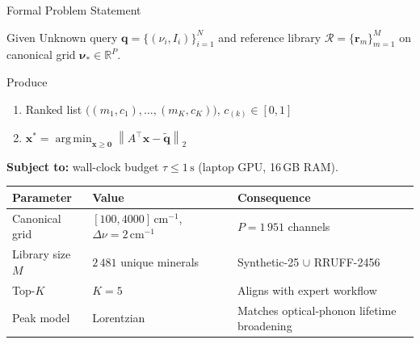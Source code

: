 \documentclass[aspectratio=169,10pt]{beamer}
\newcommand{\norm}[1]{\left\|#1\right\|}
\DeclareMathOperator*{\argmin}{arg\,min}
\begin{document}
\begin{frame}{Formal Problem Statement}
  \begin{alertblock}{Given}
    Unknown query $\mathbf{q}=\{(\nu_i,I_i)\}_{i=1}^N$ and reference
    library $\mathcal{R}=\{\mathbf{r}_m\}_{m=1}^M$ on canonical grid
    $\boldsymbol{\nu}_*\in\mathbb{R}^P$.
  \end{alertblock}

  \vspace{0.1cm}
  \begin{block}{Produce}
    \begin{enumerate}\setlength\itemsep{0.06cm}\small
      \item Ranked list $\bigl((m_1,c_1),\ldots,(m_K,c_K)\bigr)$,\quad
            $c_{(k)}\in[0,1]$
      \item $\mathbf{x}^*=\argmin_{\mathbf{x}\ge\mathbf{0}}
            \norm{A^\top\mathbf{x}-\tilde{\mathbf{q}}}_2$
    \end{enumerate}
  \end{block}

  \vspace{0.1cm}
  \textbf{Subject to:} wall-clock budget $\tau\le 1\,\text{s}$ (laptop GPU, 16\,GB RAM).

  \vspace{0.15cm}
  \footnotesize
  \begin{tabular}{@{}llp{5cm}@{}}
    \toprule
    \textbf{Parameter} & \textbf{Value} & \textbf{Consequence}\\
    \midrule
    Canonical grid & $[100,4000]\,\text{cm}^{-1}$, $\Delta\nu=2\,\text{cm}^{-1}$
                   & $P=1\,951$ channels\\[1pt]
    Library size $M$ & $2\,481$ unique minerals
                     & Synthetic-25 $\cup$ RRUFF-2456\\[1pt]
    Top-$K$ & $K=5$ & Aligns with expert workflow\\[1pt]
    Peak model & Lorentzian & Matches optical-phonon lifetime broadening\\
    \bottomrule
  \end{tabular}
\end{frame}
\end{document}
